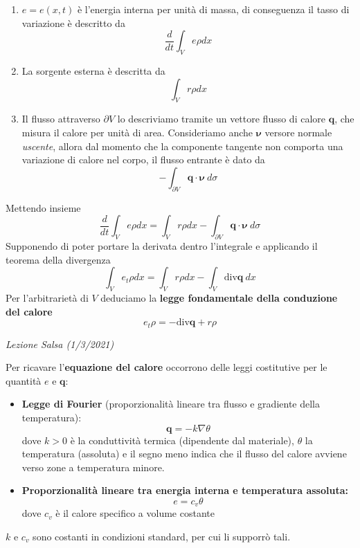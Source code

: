 \documentclass[10pt,a4paper,twoside,openright]{book}
\newcounter{conteggioS}
\newcommand{\LezioneS}[1]{
	\stepcounter{conteggioS}
	\textit{Lezione Salsa \arabic{conteggioS} (#1)}
	}
\begin{document}
\begin{enumerate}
\item $e=e(x,t)$ è l'energia interna per unità di massa, di conseguenza il tasso di variazione è descritto da\begin{equation*}
\frac{d}{dt}\int _{V} e\rho dx
\end{equation*}
\item La sorgente esterna è descritta da\begin{equation*}
\int _{V} r\rho dx
\end{equation*}
\item Il flusso attraverso $\partial V$ lo descriviamo tramite un vettore flusso di calore $\mathbf{q}$, che misura il calore per unità di area. Consideriamo anche $\displaystyle \bm{\nu}$ versore normale \emph{uscente}, allora dal momento che la componente tangente non comporta una variazione di calore nel corpo, il flusso entrante è dato da
\begin{equation*}
-\int _{\partial V}\mathbf{q} \cdotp \bm{\nu} \ d\sigma 
\end{equation*}
\end{enumerate}

Mettendo insieme
\begin{equation*}
\frac{d}{dt}\int _{V} e\rho dx=\int _{V} r\rho dx-\int _{\partial V}\mathbf{q} \cdotp \bm{\nu} \ d\sigma 
\end{equation*}
Supponendo di poter portare la derivata dentro l'integrale e applicando il teorema della divergenza
\begin{equation*}
\int _{V} e_{t} \rho dx=\int _{V} r\rho dx-\int _{V}\mathrm{div}\mathbf{q} \ dx
\end{equation*}
Per l'arbitrarietà di $\displaystyle V$ deduciamo la \textbf{legge fondamentale della conduzione del calore}
\begin{equation*}
\boxed{e_{t} \rho =-\mathrm{div}\mathbf{q} +r\rho }
\end{equation*}


\LezioneS{1/3/2021}

Per ricavare l'\textbf{equazione del calore} occorrono delle leggi costitutive per le quantità $\displaystyle e$ e $\displaystyle \mathbf{q}$:
\begin{itemize}
\item \textbf{Legge di Fourier} (proporzionalità lineare tra flusso e gradiente della temperatura):
\begin{equation*}
\mathbf{q} =-k\nabla \theta 
\end{equation*}dove $\displaystyle k >0$ è la conduttività termica (dipendente dal materiale), $\displaystyle \theta $ la temperatura (assoluta) e il segno meno indica che il flusso del calore avviene verso zone a temperatura minore.
\item \textbf{Proporzionalità lineare tra energia interna e temperatura assoluta:}
\begin{equation*}
e=c_{v} \theta 
\end{equation*}
dove $\displaystyle c_{v}$ è il calore specifico a volume costante
\end{itemize}
$\displaystyle k$ e $\displaystyle c_{v}$ sono costanti in condizioni standard, per cui li supporrò tali.
\end{document}
